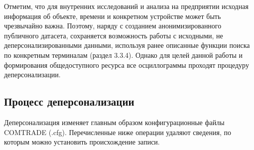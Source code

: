 Отметим, что для внутренних исследований и анализа на предприятии исходная информация об
объекте, времени и конкретном устройстве может быть чрезвычайно важна. Поэтому, наряду с
созданием анонимизированного публичного датасета, сохраняется возможность работы с
исходными, не деперсонализированными данными, используя ранее описанные функции поиска
по конкретным терминалам (раздел 3.3.4). Однако для целей данной работы и формирования
общедоступного ресурса все осциллограммы проходят процедуру
деперсонализации.\par\vspace{0.2cm}

\subsection{Процесс деперсонализации}\label{sec:ch3_depersonalization_process}

Деперсонализация изменяет главным образом конфигурационные файлы COMTRADE (.cfg).
Перечисленные ниже операции удаляют сведения, по которым можно установить происхождение
записи.\par\vspace{0.2cm}

